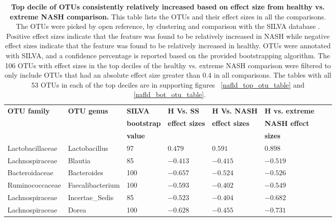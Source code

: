 \begin{table}[!ht]
\begin{tabular}{|l|l|l|l|l|l|l|l|}
\hline
\bf{OTU family} & \bf{OTU genus} & \bf{SILVA} &\bf{H Vs. SS} & \bf{H Vs. NASH} & \bf{H vs. extreme} \\
& & \bf{bootstrap} & \bf{effect sizes} & \bf{effect sizes} & \bf{NASH effect} \\
& & \bf{value} & & & \bf{sizes}\\ \hline
Lactobacillaceae & Lactobacillus & 97 & $0.479$ & $0.591$ & $0.898$ \\ \hline
Lachnospiraceae & Blautia & 85 & $-0.413$ & $-0.415$ & $-0.519$ \\ \hline
Bacteroidaceae & Bacteroides & 100 & $-0.657$ & $-0.524$ & $-0.526$ \\ \hline
Ruminococcaceae & Faecalibacterium & 100 & $-0.593$ & $-0.402$ & $-0.549$ \\ \hline
Lachnospiraceae & Incertae_Sedis & 85 & $-0.523$ & $-0.404$ & $-0.682$ \\ \hline
Lachnospiraceae & Dorea & 100 & $-0.628$ & $-0.455$ & $-0.731$ \\ \hline
\end{tabular}
\caption[Top decile of OTUs consistently relatively increased based on effect size from healthy vs. extreme NASH comparison.]{ \textbf{Top decile of OTUs consistently relatively increased based on effect size from healthy vs. extreme NASH comparison.} This table lists the OTUs and their effect sizes in all the comparisons. The OTUs were picked by open reference, by clustering and comparison with the SILVA database \cite{quast2013silva}. Positive effect sizes indicate that the feature was found to be relatively increased in NASH while negative effect sizes indicate that the feature was found to be relatively increased in healthy. OTUs were annotated with SILVA, and a confidence percentage is reported based on the provided bootstrapping algorithm. The 106 OTUs with effect sizes in the top deciles of the healthy vs. extreme NASH comparison were filtered to only include OTUs that had an absolute effect size greater than 0.4 in all comparisons. The tables with all 53 OTUs in each of the top deciles are in supporting figures ~\ref{nafld_top_otu_table} and ~\ref{nafld_bot_otu_table}.}
\label{nafld_consistent_otu_table}
\end{table}


